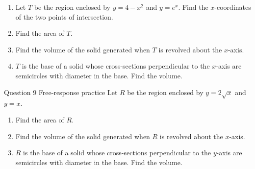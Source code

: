 \documentclass[11pt]{article}
\begin{document}
\begin{enumerate}[leftmargin=*,itemsep=2pt,start=5]
  \item Let $T$ be the region enclosed by $y=4-x^2$ and $y=e^{x}$. Find the $x$-coordinates of the two points of intersection.\work{2.8cm}
  \item Find the area of $T$.\work{2.8cm}
  \item Find the volume of the solid generated when $T$ is revolved about the $x$-axis.\work{2.8cm}
  \item $T$ is the base of a solid whose cross-sections perpendicular to the $x$-axis are semicircles with diameter in the base. Find the volume.\work{2.8cm}
\end{enumerate}

\begin{frbox}{Question 9 \textperiodcentered{} Free-response practice}
Let $R$ be the region enclosed by $y=2\sqrt{x}$ and $y=x$.
\begin{enumerate}[label=(\alph*),leftmargin=*,itemsep=2pt]
  \item Find the area of $R$.\work{2.6cm}
  \item Find the volume of the solid generated when $R$ is revolved about the $x$-axis.\work{2.6cm}
  \item $R$ is the base of a solid whose cross-sections perpendicular to the $y$-axis are semicircles with diameter in the base. Find the volume.\work{2.6cm}
\end{enumerate}
\end{frbox}
\end{document}
